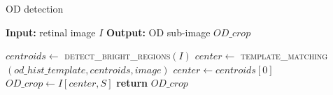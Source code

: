 \begin{algorithm}[h]
	
	\caption{OD detection}
	\label{alg:oddetection}
	{\fontsize{10}{9.5}\selectfont
	\begin{algorithmic}[1]
		
		\State \textbf{Input:} retinal image $I$ 
		\State \textbf{Output:} OD sub-image $OD\_crop$
		\medbreak

			\State $centroids \gets$ \textsc{detect\_bright\_regions}$(I)$
			\State $center \gets$ \textsc{template\_matching}$(od\_hist\_template, centroids, image)$
			\Else
			\State $center \gets centroids[0]$
			\EndIf
			\State $OD\_crop \gets I[center, S]$
			\State \textbf{return} $OD\_crop$
		\EndFunction
		
	\end{algorithmic}
	}
\end{algorithm}